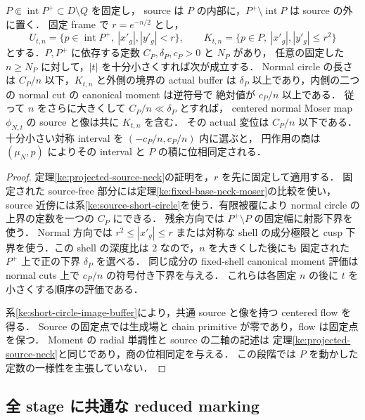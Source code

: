 \begin{lemma}
\label{ke:fixed-stage-source-neck}
$P\Subset\operatorname{int}P^+\subset D\setminus Q$ を固定し，
source は $P$ の内部に，$P^+\setminus\operatorname{int}P$ は source の外に置く．
固定 frame で $r=e^{-n/2}$ とし，
\[
 U_{t,n}=\{p\in\operatorname{int}P^+,\ |x'_g|,|y'_g|<r\},
 \qquad
 K_{t,n}=\{p\in P,\ |x'_g|,|y'_g|\le r^2\}
\]
とする．$P,P^+$ に依存する定数 $C_P,\delta_P,c_P>0$ と $N_P$ があり，
任意の固定した $n\ge N_P$ に対して，$|t|$ を十分小さくすれば次が成立する．
Normal circle の長さは $C_P/n$ 以下，$K_{t,n}$ と外側の境界の actual buffer は
$\delta_P$ 以上であり，内側の二つの normal cut の canonical moment は逆符号で
絶対値が $c_P/n$ 以上である．
従って $n$ をさらに大きくして $C_P/n\ll\delta_P$ とすれば，
centered normal Moser map $\phi_{N,t}$ の source と像は共に $K_{t,n}$ を含む．
その actual 変位は $C_P/n$ 以下である．
十分小さい対称 interval を $(-c_P/n,c_P/n)$ 内に選ぶと，
円作用の商は $(\mu_N,p)$ によりその interval と $P$ の積に位相同定される．
\end{lemma}

\begin{proof}
定理\ref{ke:projected-source-neck}の証明を，$r$ を先に固定して適用する．
固定された source-free 部分には定理\ref{ke:fixed-base-neck-moser}の比較を使い，
source 近傍には系\ref{ke:source-short-circle}を使う．有限被覆により
normal circle の上界の定数を一つの $C_P$ にできる．
残余方向では $P^+\setminus P$ の固定幅に射影下界を使う．
Normal 方向では $r^2\le|x'_g|\le r$ または対称な shell の成分極限と
cusp 下界を使う．この shell の深度比は $2$ なので，$n$ を大きくした後にも
固定された $P^+$ 上で正の下界 $\delta_P$ を選べる．
同じ成分の fixed-shell canonical moment 評価は normal cuts 上で
$c_P/n$ の符号付き下界を与える．
これらは各固定 $n$ の後に $t$ を小さくする順序の評価である．

系\ref{ke:short-circle-image-buffer}により，共通 source と像を持つ centered flow を得る．
Source の固定点では生成場と chain primitive が零であり，flow は固定点を保つ．
Moment の radial 単調性と source の二軸の記述は
定理\ref{ke:projected-source-neck}と同じであり，商の位相同定を与える．
この段階では $P$ を動かした定数の一様性を主張していない．
\end{proof}

\subsection{全 stage に共通な reduced marking}

